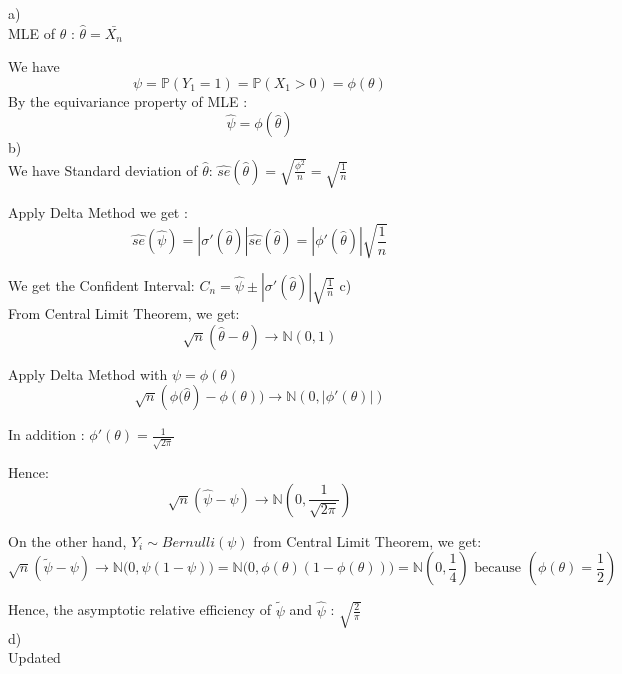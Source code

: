 \documentclass[10pt]{article}
\newenvironment{problem}[2][Problem]{\begin{trivlist}
\item[\hskip \labelsep {\bfseries #1}\hskip \labelsep {\bfseries #2.}]}{\end{trivlist}}
\begin{document}
\begin{problem}{6}
a) \\
MLE of $\theta$ : $\hat{\theta}=\bar{X_n}$

We have
\[\psi =\mathbb{P}(Y_1=1)=\mathbb{P}(X_1 > 0)= \phi (\theta)\]
By the equivariance property of MLE :
\[\hat{\psi} = \phi (\hat{\theta})\]
b) \\

We have Standard deviation of $\hat{\theta}$: $\hat{se} (\hat{\theta})=\sqrt{\frac{\phi ^2}{n}}=\sqrt{\frac{1}{n}}$

Apply Delta Method we get :
\[\hat{se} (\hat{\psi})= |\sigma '(\hat{\theta})|\hat{se} (\hat{\theta})=|\phi '(\hat{\theta})| \sqrt{\frac{1}{n}}\]

We get the Confident Interval: $C_n= \hat{\psi} \pm |\sigma '(\hat{\theta})| \sqrt{\frac{1}{n}}$
c) \\

From Central Limit Theorem, we get:
\[\sqrt{n} (\hat{\theta}- \theta) \rightarrow \mathbb{N}(0,1)\]

Apply Delta Method with $\psi= \phi (\theta)$
\[\sqrt{n} ( \phi \big(\hat{\theta})- \phi(\theta)\big) \rightarrow \mathbb{N}(0,|\phi '(\theta)|)\]

In addition : $\phi '(\theta)=\frac{1}{\sqrt{2\pi}}$

Hence:
\[\sqrt{n} ( \hat{\psi}- \psi) \rightarrow \mathbb{N}(0,\frac{1}{\sqrt{2\pi}})\]

On the other hand, $Y_i \sim Bernulli(\psi)$ from Central Limit Theorem, we get:
\[\sqrt{n} ( \tilde{\psi}- \psi) \rightarrow \mathbb{N}\big(0,\psi(1-\psi)\big)=\mathbb{N}\big(0,\phi(\theta)(1-\phi (\theta))\big)=\mathbb{N}(0, \frac{1}{4})   \text{       because }(\phi(\theta)=\frac{1}{2})\]

Hence, the asymptotic relative efficiency of $\tilde{\psi}$ and $\hat{\psi}$ : $\sqrt{\frac{2}{\pi}}$\\
d) \\

Updated

\end{problem}
\end{document}

